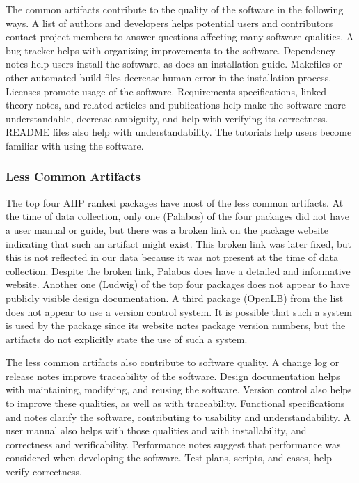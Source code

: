 \documentclass[12pt, notitlepage]{article}
\begin{document}
The common artifacts contribute to the quality of the software in the following ways. A list of authors and developers helps potential users and contributors contact project members to answer questions affecting many software qualities. A bug tracker helps with organizing improvements to the software. Dependency notes help users install the software, as does an installation guide. Makefiles or other automated build files decrease human error in the installation process. Licenses promote usage of the software. Requirements specifications, linked theory notes, and related articles and publications help make the software more understandable, decrease ambiguity, and help with verifying its correctness. README files also help with understandability. The tutorials help users become familiar with using the software.


\subsubsection{Less Common Artifacts}\label{lesscommon}
The top four AHP ranked packages have most of the less common artifacts.
At the time of data collection, only one (Palabos) of the four packages did not have a user manual or guide, but there was a broken link on the package website indicating that such an artifact might exist. This broken link was later fixed, but this is not reflected in our data because it was not present at the time of data collection. Despite the broken link, Palabos does have a detailed and informative website. Another one (Ludwig) of the top four packages does not appear to have publicly visible design documentation. A third package (OpenLB) from the list does not appear to use a version control system. It is possible that such a system is used by the package since its website notes package version numbers, but the artifacts do not explicitly state the use of such a system.

The less common artifacts also contribute to software quality. A change log or release notes improve traceability of the software. Design documentation helps with maintaining, modifying, and reusing the software. Version control also helps to improve these qualities, as well as with traceability. Functional specifications and notes clarify the software, contributing to usability and understandability. A user manual also helps with those qualities and with installability, and correctness and verificability. Performance notes suggest that performance was considered when developing the software. Test plans, scripts, and cases, help verify correctness. 
\end{document}
